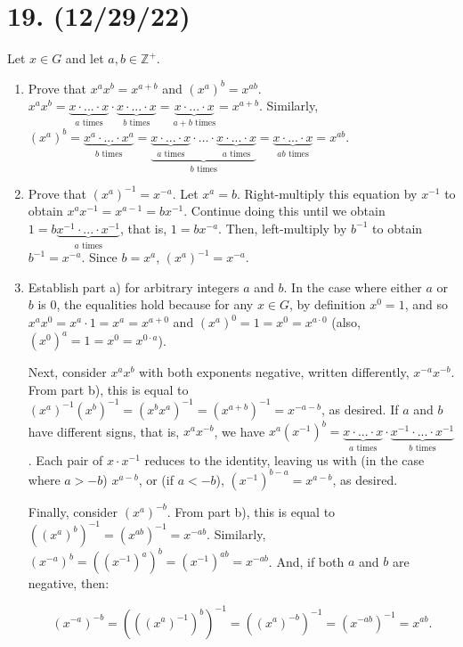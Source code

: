 \documentclass{article}
\begin{document}
\section*{19. (12/29/22)}

Let $x \in G$ and let $a, b \in \mathbb{Z}^+$. 

\begin{enumerate}[label=\alph*)]
      \item Prove that $x^a x^b = x^{a + b}$ and $(x^a)^b = x^{ab}$.\newline
            $x^a x^b = \underbrace{x \cdot ... \cdot x}_{\text{$a$ times}} \cdot \underbrace{x \cdot ... \cdot x}_{\text{$b$ times}} = \underbrace{x \cdot ... \cdot x}_{\text{$a + b$ times}} = x^{a + b}$.\newline
            Similarly, $(x^a)^b = \underbrace{x^a \cdot ... \cdot x^a}_{\text{$b$ times}} = \underbrace{\underbrace{x \cdot ... \cdot x}_{\text{$a$ times}} \cdot ... \cdot \underbrace{x \cdot ... \cdot x}_{\text{$a$ times}}}_{\text{$b$ times}} = \underbrace{x \cdot ... \cdot x}_{\text{$ab$ times}} = x^{ab}$.
      \item Prove that $(x^a)^{-1} = x^{-a}$.\newline
            Let $x^a = b$. Right-multiply this equation by $x^{-1}$ to obtain $x^a x^{-1} = x^{a - 1} = b x^{-1}$. Continue doing this until we obtain $1 = b \underbrace{x^{-1} \cdot ... \cdot x^{-1}}_{\text{$a$ times}}$, that is, $1 = b x^{-a}$. Then, left-multiply by $b^{-1}$ to obtain $b^{-1} = x^{-a}$. Since $b = x^a$, $(x^{a})^{-1} = x^{-a}$.
      \item Establish part a) for arbitrary integers $a$ and $b$.\newline
            In the case where either $a$ or $b$ is $0$, the equalities hold because for any $x \in G$, by definition $x^0 = 1$, and so $x^a x^0 = x^a \cdot 1 = x^a = x^{a + 0}$ and $(x^a)^0 = 1 = x^0 = x^{a \cdot 0}$ (also, $(x^0)^a = 1 = x^0 = x^{0 \cdot a}$).
            
      Next, consider $x^a x^b$ with both exponents negative, written differently, $x^{-a} x^{-b}$. From part b), this is equal to $(x^a)^{-1} (x^b)^{-1} = (x^b x^a)^{-1} = (x^{a + b})^{-1} = x^{-a - b}$, as desired. If $a$ and $b$ have different signs, that is, $x^a x^{-b}$, we have $x^a (x^{-1})^b = \underbrace{x \cdot ... \cdot x}_{\text{$a$ times}} \cdot \underbrace{x^{-1} \cdot ... \cdot x^{-1}}_{\text{$b$ times}}$. Each pair of $x \cdot x^{-1}$ reduces to the identity, leaving us with (in the case where $a > -b$) $x^{a - b}$, or (if $a < -b$), $(x^{-1})^{b - a} = x^{a - b}$, as desired.

      Finally, consider $(x^a)^{-b}$. From part b), this is equal to $((x^a)^b)^{-1} = (x^{ab})^{-1} = x^{-ab}$. Similarly, $(x^{-a})^b = ((x^{-1})^a)^b = (x^{-1})^{ab} = x^{-ab}$. And, if both $a$ and $b$ are negative, then:
      
      \begin{equation*}
            (x^{-a})^{-b} = (((x^a)^{-1})^b)^{-1} = ((x^a)^{-b})^{-1} = (x^{-ab})^{-1} = x^{ab}.
      \end{equation*}
\end{enumerate}
\end{document}
